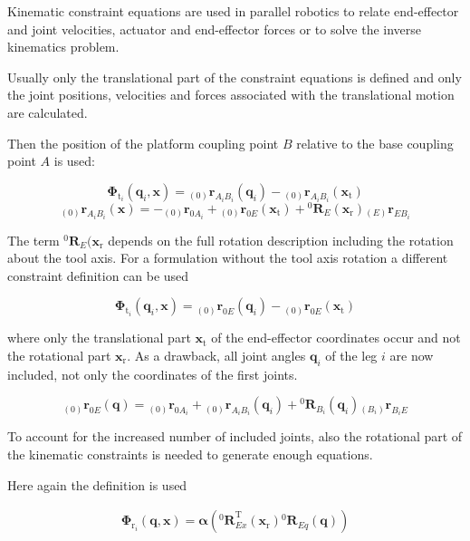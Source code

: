 \documentclass[twocolumn,10pt]{IFTOMM}
\newcommand{\bm}[1]{\boldsymbol{#1}}
\newcommand{\ortvek}[4]{{ }_{(#1)}{\boldsymbol{#2}}^{#3}_{#4} }
\newcommand{\rotmat}[2]{{{ }^{#1}\boldsymbol{R}}_{#2}}
\newcommand{\transp}[0]{{\mathrm{T}}}
\begin{document}
Kinematic constraint equations are used in parallel robotics to relate end-effector and joint velocities, actuator and end-effector forces or to solve the inverse kinematics problem.

Usually only the translational part of the constraint equations is defined and only the joint positions, velocities and forces associated with the translational motion are calculated. %

Then the position of the platform coupling point $B$ relative to the base coupling point $A$ is used:

\begin{equation}
\bm{\Phi}_{\mathrm{t}_i}(\bm{q}_i,\bm{x}) = \ortvek{0}{r}{}{A_iB_i}(\bm{q}_i) - \ortvek{0}{r}{}{A_iB_i}(\bm{x}_{\mathrm{t}})
\end{equation}
\begin{equation}
\ortvek{0}{r}{}{A_iB_i}(\bm{x}) = 
- \ortvek{0}{r}{}{0A_i}
+ \ortvek{0}{r}{}{0E}(\bm{x}_{\mathrm{t}}) + \rotmat{0}{E}(\bm{x}_{\mathrm{r}}) \ortvek{E}{r}{}{EB_i}
\end{equation}

The term $\rotmat{0}{E}(\bm{x}_{\mathrm{r}}$ depends on the full rotation description including the rotation about the tool axis.
For a formulation without the tool axis rotation a different constraint definition can be used

\begin{equation}
\bm{\Phi}_{\mathrm{t}_i}(\bm{q}_i,\bm{x}) = 
\ortvek{0}{r}{}{0E}(\bm{q}_i) - \ortvek{0}{r}{}{0E}(\bm{x}_{\mathrm{t}})
\end{equation}

where only the translational part $\bm{x}_{\mathrm{t}}$ of the end-effector coordinates occur and not the rotational part $\bm{x}_{\mathrm{r}}$.
As a drawback, all joint angles $\bm{q}_i$ of the leg $i$ are now included, not only the coordinates of the first joints.

\begin{equation}
\ortvek{0}{r}{}{0E}(\bm{q}) = 
\ortvek{0}{r}{}{0A_i}
+ \ortvek{0}{r}{}{A_iB_i}(\bm{q}_i) + \rotmat{0}{B_i}(\bm{q}_i) \ortvek{B_i}{r}{}{B_iE}
\end{equation}

To account for the increased number of included joints, also the rotational part of the kinematic constraints is needed to generate enough equations.

Here again the definition is used

\begin{align}
\bm{\Phi}_{\mathrm{r}_i}(\bm{q},\bm{x})
=\bm{\alpha}\left(\rotmat{0}{Ex}^\transp (\bm{x}_{\mathrm{r}})\rotmat{0}{Eq}(\bm{q})\right)
\end{align}
\end{document}

